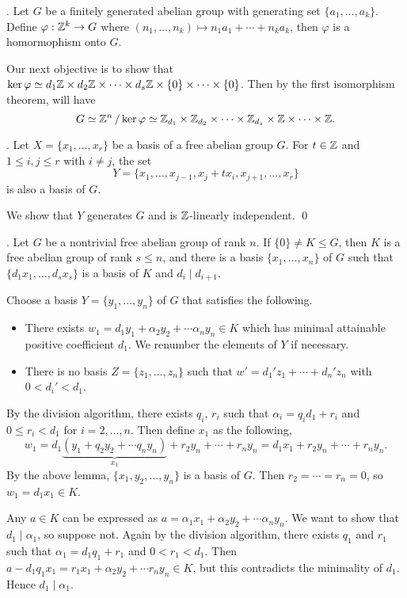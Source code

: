 \thm. Let \(G\) be a finitely generated abelian group with generating set \(\{a_1, \dots, a_k\}\). Define \(\varphi : \mathbb{Z}^k \rightarrow G\) where \((n_1, \dots, n_k) \mapsto n_1a_1 + \cdots + n_ka_k\), then \(\varphi\) is a homormophism onto \(G\).

Our next objective is to show that \(\ker \varphi \simeq d_1 \mathbb{Z} \times d_2 \mathbb{Z} \times \cdots \times d_s \mathbb{Z} \times \{0\} \times \cdots \times \{0\}\). Then by the first isomorphism theorem, will have
\[
    G \simeq \mathbb{Z}^n \operatorname{/} \ker \varphi \simeq \mathbb{Z}_{d_1} \times \mathbb{Z}_{d_2} \times \cdots \times \mathbb{Z}_{d_s} \times \mathbb{Z} \times \cdots \times \mathbb{Z}.
\]

\lemma. Let \(X = \{x_1, \dots, x_r\}\) be a basis of a free abelian group \(G\). For \(t \in \mathbb{Z}\) and \(1 \leq i, j \leq r\) with \(i \neq j\), the set
\[
    Y = \{x_1, \dots, x_{j-1}, x_j + tx_i, x_{j+1}, \dots, x_r\}
\]
is also a basis of \(G\).

\pf We show that \(Y\) generates \(G\) and is \(\mathbb{Z}\)-linearly independent. \qed

\lemma. Let \(G\) be a nontrivial free abelian group of rank \(n\). If \(\{0\} \neq K \leq G\), then \(K\) is a free abelian group of rank \(s \leq n\), and there is a basis \(\{x_1, \dots, x_n\}\) of \(G\) such that \(\{d_1 x_1, \dots, d_s x_s\}\) is a basis of \(K\) and \(d_i \mid d_{i+1}\).

\pf Choose a basis \(Y = \{y_1, \dots, y_n\}\) of \(G\) that satisfies the following.
\begin{itemize}
    \item There exists \(w_1 = d_1y_1 + \alpha_2 y_2 + \cdots \alpha_n y_n \in K\) which has minimal attainable positive coefficient \(d_1\). We renumber the elements of \(Y\) if necessary.
    \item There is no basis \(Z = \{z_1, \dots, z_n\}\) such that \(w' = d_1' z_1 + \cdots + d_n' z_n\) with \(0 < d_i' < d_1\).
\end{itemize}

 By the division algorithm, there exists \(q_i\), \(r_i\) such that \(\alpha_i = q_i d_1 + r_i\) and \(0 \leq r_i < d_1\) for \(i = 2, \dots, n\). Then define \(x_1\) as the following,
\[
    w_1 = d_1\underbrace{(y_1 + q_2y_2 + \cdots q_ny_n)}_{x_1} + r_2y_n + \cdots + r_ny_n = d_1x_1 + r_2y_n + \cdots + r_ny_n.
\]
By the above lemma, \(\{x_1, y_2, \dots, y_n\}\) is a basis of \(G\). Then \(r_2 = \cdots = r_n = 0\), so \(w_1 = d_1x_1 \in K\).

 Any \(a \in K\) can be expressed as \(a = \alpha_1 x_1 + \alpha_2 y_2 + \cdots \alpha_n y_n\). We want to show that \(d_1 \mid \alpha_1\), so suppose not. Again by the division algorithm, there exists \(q_1\) and \(r_1\) such that \(\alpha_1 = d_1 q_1 + r_1\) and \(0 < r_1 < d_1\). Then \(a - d_1q_1x_1 = r_1x_1 + \alpha_2y_2 + \cdots r_ny_n \in K\), but this contradicts the minimality of \(d_1\). Hence \(d_1 \mid \alpha_1\).

